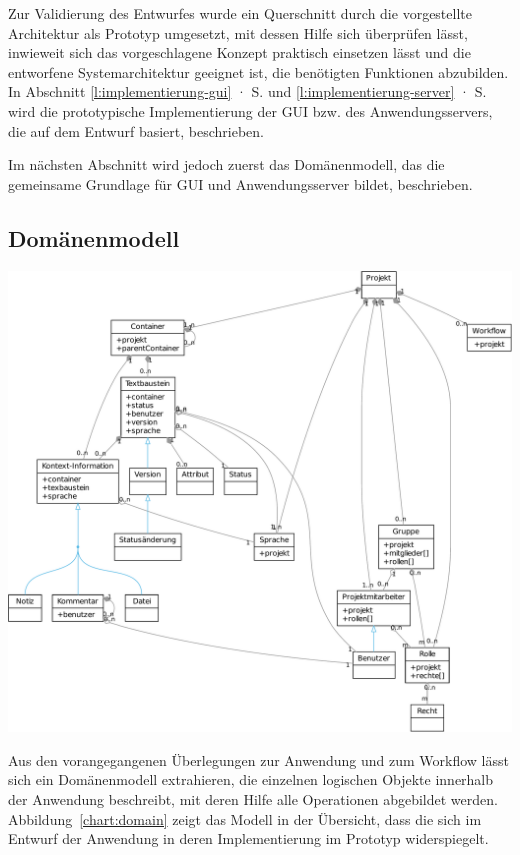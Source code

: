 Zur Validierung des Entwurfes wurde ein Querschnitt durch die vorgestellte Architektur als Prototyp umgesetzt, mit dessen Hilfe sich überprüfen lässt, inwieweit sich das vorgeschlagene Konzept praktisch einsetzen lässt und die entworfene Systemarchitektur geeignet ist, die benötigten Funktionen abzubilden. In Abschnitt \ref{l:implementierung-gui} · S.\pageref{l:implementierung-gui} und \ref{l:implementierung-server} · S.\pageref{l:implementierung-server} wird die prototypische Implementierung der GUI bzw. des Anwendungsservers, die auf dem Entwurf basiert, beschrieben.

Im nächsten Abschnitt wird jedoch zuerst das Domänenmodell, das die gemeinsame Grundlage für GUI und Anwendungsserver bildet, beschrieben.

\pagebreak

\subsection{Domänenmodell}\label{l:domänenmodell}

\begin{center}
\includegraphics[width=\textwidth]{media/domain.pdf}
\label{chart:domain}
\end{center}

Aus den vorangegangenen Überlegungen zur Anwendung und zum Workflow lässt sich ein Domänenmodell extrahieren, die einzelnen logischen Objekte innerhalb der Anwendung beschreibt, mit deren Hilfe alle Operationen abgebildet werden. Abbildung~\ref{chart:domain} zeigt das Modell in der Übersicht, dass die sich im Entwurf der Anwendung in deren Implementierung im Prototyp widerspiegelt.

